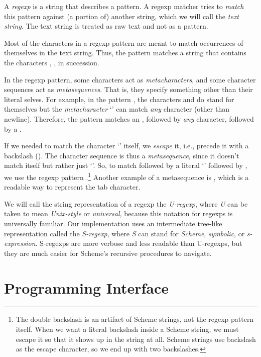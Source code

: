 A \emph{regexp} is a string that describes a pattern.  A regexp
matcher tries to \emph{match} this pattern against (a portion of)
another string, which we will call the \emph{text string}.  The text
string is treated as raw text and not as a pattern.

Most of the characters in a regexp pattern are meant to match
occurrences of themselves in the text string.  Thus, the pattern
 matches a string that contains the characters ,
,  in succession.

In the regexp pattern, some characters act as \emph{metacharacters},
and some character sequences act as \emph{metasequences}.  That is,
they specify something other than their literal selves.  For example,
in the pattern , the characters  and  do
stand for themselves but the \emph{metacharacter} `'  can
match \emph{any} character (other than newline).  Therefore, the
pattern  matches an , followed by \emph{any}
character, followed by a .

If we needed to match the character `' itself, we
\emph{escape} it, i.e., precede it with a backslash
(\code{\textbackslash}).  The character sequence
 is thus a \emph{metasequence}, since it
doesn't match itself but rather just `'.  So, to match
 followed by a literal `' followed by , we use
the regexp pattern
.\footnote{The double
  backslash is an artifact of Scheme strings, not the regexp pattern
  itself.  When we want a literal backslash inside a Scheme string, we
  must escape it so that it shows up in the string at all. Scheme
  strings use backslash as the escape character, so we end up with two
  backslashes.} Another example of a metasequence is
, which is a readable way to represent the tab
character.

We will call the string representation of a regexp the
\emph{U-regexp}, where \emph{U} can be taken to mean {\em Unix-style}
or \emph{universal}, because this notation for regexps is universally
familiar.  Our implementation uses an intermediate tree-like
representation called the \emph{S-regexp}, where \emph{S} can stand
for \emph{Scheme}, \emph{symbolic}, or \emph{s-expression}.  S-regexps
are more verbose and less readable than U-regexps, but they are much
easier for Scheme's recursive procedures to navigate.

\section {Programming Interface}


